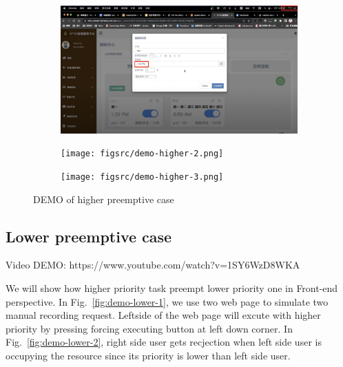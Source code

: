 \begin{figure}[H]
    \centering
    \begin{subfigure}{\textwidth}
        \includegraphics[width=\textwidth]{figsrc/demo-higher-1.png}
        \label{fig:demo-higher-1}
    \end{subfigure}
\end{figure}

\begin{figure}[H]
    \ContinuedFloat
    \centering
    \begin{subfigure}{\textwidth}
        \texttt{[image: figsrc/demo-higher-2.png]}
        \label{fig:demo-higher-2}
    \end{subfigure}
\end{figure}

\begin{figure}[H]
    \ContinuedFloat
    \centering
    \begin{subfigure}{\textwidth}
        \texttt{[image: figsrc/demo-higher-3.png]}
        \label{fig:demo-higher-3}
    \end{subfigure}

    \caption{DEMO of higher preemptive case}
    \label{fig:demo-higher}
\end{figure}

\subsection{Lower preemptive case}
Video DEMO: https://www.youtube.com/watch?v=1SY6WzD8WKA

We will show how higher priority task preempt lower priority one in Front-end perspective. In Fig.~\ref{fig:demo-lower-1}, we use two web page to simulate two manual recording request. Leftside of the web page will excute with higher priority by pressing forcing executing button at left down corner. In Fig.~\ref{fig:demo-lower-2}, right side user gets recjection when left side user is occupying the resource since its priority is lower than left side user.

